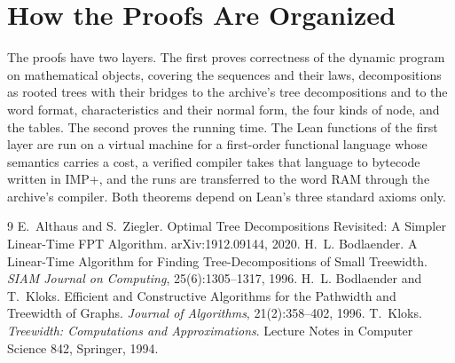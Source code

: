 \documentclass[11pt,a4paper]{article}
\theoremstyle{definition}
\begin{document}
\section{How the Proofs Are Organized}

The proofs have two layers. The first proves correctness of the dynamic program on mathematical
objects, covering the sequences and their laws, decompositions as rooted trees with their bridges
to the archive's tree decompositions and to the word format, characteristics and their normal form,
the four kinds of node, and the tables. The second proves the running time. The Lean functions of
the first layer are run on a virtual machine for a first-order functional language whose semantics
carries a cost, a verified compiler takes that language to bytecode written in IMP+, and the
runs are transferred to the word RAM through the archive's compiler. Both theorems depend on Lean's
three standard axioms only.

\begin{thebibliography}{9}
 E.~Althaus and S.~Ziegler.
Optimal Tree Decompositions Revisited: A Simpler Linear-Time {FPT} Algorithm.
arXiv:1912.09144, 2020.
 H.~L. Bodlaender.
A Linear-Time Algorithm for Finding Tree-Decompositions of Small Treewidth.
\emph{SIAM Journal on Computing}, 25(6):1305--1317, 1996.
 H.~L. Bodlaender and T.~Kloks.
Efficient and Constructive Algorithms for the Pathwidth and Treewidth of Graphs.
\emph{Journal of Algorithms}, 21(2):358--402, 1996.
 T.~Kloks.
\emph{Treewidth: Computations and Approximations}.
Lecture Notes in Computer Science 842, Springer, 1994.
\end{thebibliography}
\end{document}
